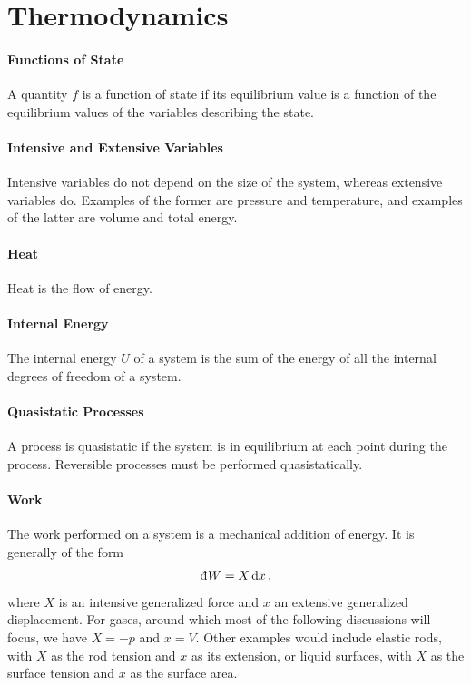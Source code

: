 \section{Thermodynamics}

\paragraph{Functions of State}
A quantity $f$ is a function of state if its equilibrium value is a function of the equilibrium values of the variables describing the state.

\paragraph{Intensive and Extensive Variables}
Intensive variables do not depend on the size of the system, whereas extensive variables do. Examples of the former are pressure and temperature, and examples of the latter are volume and total energy.

\paragraph{Heat}
Heat is the flow of energy.

\paragraph{Internal Energy}
The internal energy $U$ of a system is the sum of the energy of all the internal degrees of freedom of a system.

\paragraph{Quasistatic Processes}
A process is quasistatic if the system is in equilibrium at each point during the process. Reversible processes must be performed quasistatically.

\paragraph{Work}
The work performed on a system is a mechanical addition of energy. It is generally of the form
\begin{align*}
	\din{W} = X\dd{x},
\end{align*}
where $X$ is an intensive generalized force and $x$ an extensive generalized displacement. For gases, around which most of the following discussions will focus, we have $X = -p$ and $x = V$. Other examples would include elastic rods, with $X$ as the rod tension and $x$ as its extension, or liquid surfaces, with $X$ as the surface tension and $x$ as the surface area.

